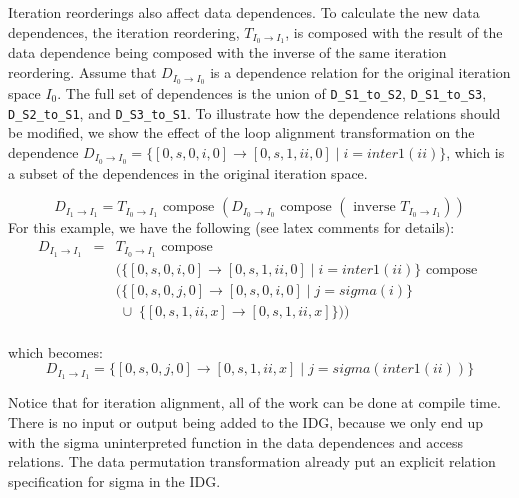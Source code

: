 \documentclass{article}
\begin{document}
Iteration reorderings also affect data dependences.  To calculate the new data dependences, the 
iteration reordering, $T_{I_0 \rightarrow I_1}$, is composed with the result of the data dependence being composed with
the inverse of the same iteration reordering.  Assume that $D_{I_0  \rightarrow I_0}$ is 
a dependence relation for the original iteration space $I_0$.  The full set of dependences
is the union of 
{\tt D\_S1\_to\_S2}, {\tt D\_S1\_to\_S3}, {\tt D\_S2\_to\_S1}, and {\tt D\_S3\_to\_S1}.
To illustrate how the dependence relations should be modified, 
we show the effect of the loop alignment transformation on the dependence $D_{I_0  \rightarrow I_0} =  \{ [0, s, 0, i, 0] \rightarrow [0, s, 1, ii, 0]  \; | \;  i = inter1(ii)\}$, which is a subset of the dependences in the original iteration space.


\[
	D_{I_1  \rightarrow I_1} = T_{I_0 \rightarrow I_1}  \mbox{ compose }  (D_{I_0  \rightarrow I_0}  \mbox{ compose } (\mbox{ inverse } T_{I_0 \rightarrow I_1}) )
\]
For this example, we have the following (see latex comments for details):
\[
\begin{array}{rcl}
	D_{I_1  \rightarrow I_1} & = & T_{I_0 \rightarrow I_1}  \mbox{ compose } \\
	&  & ( \{ [0, s, 0, i, 0] \rightarrow [0, s, 1, ii, 0]  \; | \;  i = inter1(ii)\} \mbox{ compose } \\
	& & (\{ [ 0, s, 0, j, 0]  \rightarrow  [0, s, 0, i, 0 ]  \; | \; j = sigma(i)  \} \\
	& & \; \cup \; \{ [0, s, 1, ii, x ] \rightarrow [ 0, s, 1, ii, x] \} )  ) \\
\end{array}
\]



which becomes:
\[
	D_{I_1  \rightarrow I_1}  = \{   [ 0, s, 0, j, 0 ] \rightarrow [0, s,1, ii, x ] \; | \; j = sigma(inter1(ii)) \} 
\]


Notice that for iteration alignment, all of the work can be done at compile time.  There is no input or output being added to the IDG, because we only end up with the sigma uninterpreted function in the data dependences and access relations.
The data permutation transformation already put an explicit relation specification for sigma in the IDG.


\end{document}
